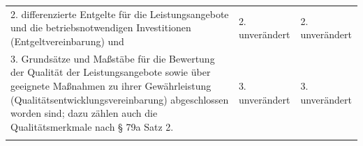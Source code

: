 \documentclass[10pt,a4paper,landscape]{article}
\begin{document}
\begin{longtable}{|L{8.2cm}|L{8.2cm}|L{8.2cm}|}
\hhline{|---|}
2.  \newline differenzierte Entgelte für die  \newline Leistungsangebote und die  \newline betriebsnotwendigen Investitionen  \newline (Entgeltvereinbarung) und & 2. unverändert & 2. unverändert \\
\hhline{|---|}
3.  \newline Grundsätze und Maßstäbe für die  \newline Bewertung der Qualität der  \newline Leistungsangebote sowie über geeignete  \newline Maßnahmen zu ihrer Gewährleistung  \newline (Qualitätsentwicklungsvereinbarung)  \newline abgeschlossen worden sind; dazu zählen  \newline auch die Qualitätsmerkmale nach \S{} 79a  \newline Satz 2. & 3. unverändert & 3. unverändert \\
\hhline{|---|}

\end{longtable}
\end{document}

